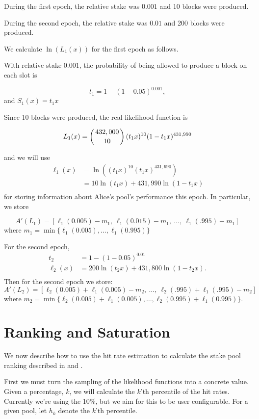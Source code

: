 \documentclass[11pt,a4paper,dvipsnames,twosided]{article}
\begin{document}
During the first epoch, the relative stake was $0.001$ and 10 blocks were produced.

During the second epoch, the relative stake was $0.01$ and 200 blocks were produced.

We calculate $\ln(L_1(x))$ for the first epoch as follows.

With relative stake $0.001$, the probability of being allowed to produce a block on
each slot is

\[ t_1 = 1-(1-0.05)^{0.001}, \]
and $S_1(x)= t_1x$

Since 10 blocks were produced, the real likelihood function is

\[ L_1(x) =  \left( 432,000 \atop 10 \right) (t_1x)^{10} (1-t_1x)^{431,990} \]

and we will use
\[
\begin{array}{rl}
  \ell_1(x) &= \ln\left( (t_1x)^{10} (t_1x)^{431,990} \right) \\
            &= 10 \ln(t_1 x) + 431,990 \ln(1 - t_1 x) \\
\end{array}
\]
for storing information about Alice's pool's performance this epoch.
In particular, we store

\[ A'(L_1) = [\ell_1(0.005)-m_1,~\ell_1(0.015)-m_1,~\ldots,~\ell_1(.995)-m_1] \]
where $m_1=\min\{\ell_1(0.005),\ldots,\ell_1(0.995)\}$

For the second epoch,
\[
\begin{array}{rl}
  t_2 &= 1-(1-0.05)^{0.01} \\
  \ell_2(x) &= 200 \ln(t_2 x) + 431,800 \ln(1 - t_2 x).\\
\end{array}
\]
Then for the second epoch we store:
\[ A'(L_2) = [\ell_2(0.005)+\ell_1(0.005)-m_2,~\ldots,~\ell_2(.995)+\ell_1(.995)-m_2] \]
where $m_2=\min\{\ell_2(0.005)+\ell_1(0.005),\ldots,\ell_2(0.995)+\ell_1(0.995)\}$.

\section{Ranking and Saturation}

We now describe how to use the hit rate estimation to calculate the stake pool ranking
described in \cite{bkks2018} and \cite[Section 5.6]{delegation_design}.

First we must turn the sampling of the likelihood functions into a concrete value.
Given a percentage, $k$, we will calculate the $k$'th percentile of the hit rates.
Currently we're using the 10\%, but we aim for this to be user configurable.
For a given pool, let $h_k$ denote the $k$'th percentile.
\end{document}
